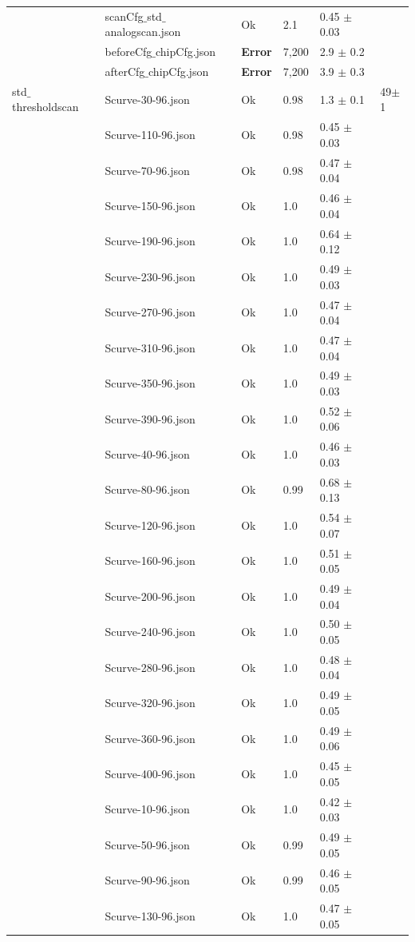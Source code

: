 \begin{longtable}{|llllll|}
 & scanCfg$\_$std$\_$analogscan.json & Ok & 2.1 & 0.45 $\pm$ 0.03 & \\
 & beforeCfg$\_$chipCfg.json & { \bf Error} & 7,200 & 2.9 $\pm$ 0.2 & \\
 & afterCfg$\_$chipCfg.json & { \bf Error} & 7,200 & 3.9 $\pm$ 0.3 & \\
\hline
std$\_$thresholdscan & Scurve-30-96.json & Ok & 0.98 & 1.3 $\pm$ 0.1 & 49$\pm$1\\
 & Scurve-110-96.json & Ok & 0.98 & 0.45 $\pm$ 0.03 & \\
 & Scurve-70-96.json & Ok & 0.98 & 0.47 $\pm$ 0.04 & \\
 & Scurve-150-96.json & Ok & 1.0 & 0.46 $\pm$ 0.04 & \\
 & Scurve-190-96.json & Ok & 1.0 & 0.64 $\pm$ 0.12 & \\
 & Scurve-230-96.json & Ok & 1.0 & 0.49 $\pm$ 0.03 & \\
 & Scurve-270-96.json & Ok & 1.0 & 0.47 $\pm$ 0.04 & \\
 & Scurve-310-96.json & Ok & 1.0 & 0.47 $\pm$ 0.04 & \\
 & Scurve-350-96.json & Ok & 1.0 & 0.49 $\pm$ 0.03 & \\
 & Scurve-390-96.json & Ok & 1.0 & 0.52 $\pm$ 0.06 & \\
 & Scurve-40-96.json & Ok & 1.0 & 0.46 $\pm$ 0.03 & \\
 & Scurve-80-96.json & Ok & 0.99 & 0.68 $\pm$ 0.13 & \\
 & Scurve-120-96.json & Ok & 1.0 & 0.54 $\pm$ 0.07 & \\
 & Scurve-160-96.json & Ok & 1.0 & 0.51 $\pm$ 0.05 & \\
 & Scurve-200-96.json & Ok & 1.0 & 0.49 $\pm$ 0.04 & \\
 & Scurve-240-96.json & Ok & 1.0 & 0.50 $\pm$ 0.05 & \\
 & Scurve-280-96.json & Ok & 1.0 & 0.48 $\pm$ 0.04 & \\
 & Scurve-320-96.json & Ok & 1.0 & 0.49 $\pm$ 0.05 & \\
 & Scurve-360-96.json & Ok & 1.0 & 0.49 $\pm$ 0.06 & \\
 & Scurve-400-96.json & Ok & 1.0 & 0.45 $\pm$ 0.05 & \\
 & Scurve-10-96.json & Ok & 1.0 & 0.42 $\pm$ 0.03 & \\
 & Scurve-50-96.json & Ok & 0.99 & 0.49 $\pm$ 0.05 & \\
 & Scurve-90-96.json & Ok & 0.99 & 0.46 $\pm$ 0.05 & \\
 & Scurve-130-96.json & Ok & 1.0 & 0.47 $\pm$ 0.05 & \\

\end{longtable}
